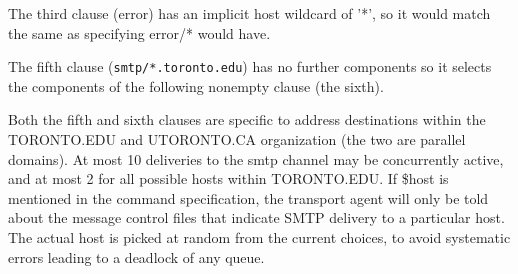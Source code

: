 The third clause (error) has an implicit host wildcard  of
'*',  so  it  would  match  the same as specifying error/*
would have.

The fifth clause ({\tt smtp/*.toronto.edu}) has no further  
components so it selects the components of the following nonempty 
clause (the sixth).

Both the fifth and sixth clauses are specific  to  address
destinations  within the TORONTO.EDU and UTORONTO.CA 
organization (the two  are  parallel  domains).   At  most  10
deliveries to the smtp channel may be concurrently active,
and at most 2 for all possible hosts  within  TORONTO.EDU.
If \$host  is  mentioned in the command specification, the
transport agent will only be told about the  message  control  
files that indicate SMTP delivery to a particular
host. The actual host is picked at random from the  current  
choices, to avoid systematic errors leading to a deadlock of any queue.
